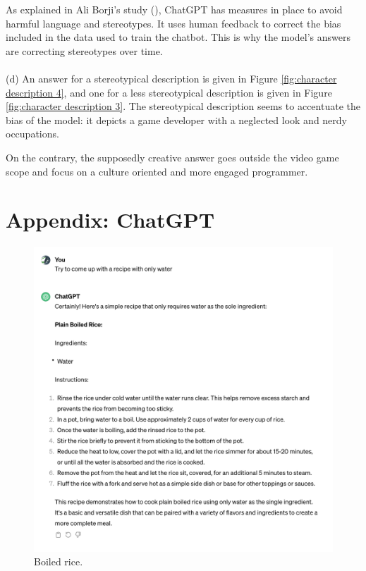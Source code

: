 \documentclass[a4paper]{article}
\begin{document}
As explained in Ali Borji's study (\cite{Borji:2023}), ChatGPT has measures in place to avoid harmful language and stereotypes.
It uses human feedback to correct the bias included in the data used to train the chatbot. This is why the model's answers are correcting stereotypes over time.
\\
\\
(d) An answer for a stereotypical description is given in Figure \ref{fig:character description 4}, and one for a less stereotypical description is given in Figure \ref{fig:character description 3}.
The stereotypical description seems to accentuate the bias of the model: it depicts a game developer with a neglected look and nerdy occupations.

On the contrary, the supposedly creative answer goes outside the video game scope and focus on a culture oriented and more engaged programmer.

\section*{Appendix: ChatGPT}

\begin{figure}[H]
  \begin{center}
    \includegraphics[width=\textwidth]{task2/boiled_rice.png}
    \caption{Boiled rice.}
    \label{fig:boiled_rice}
  \end{center}
\end{figure}
\end{document}
